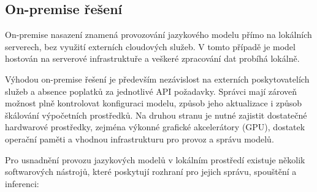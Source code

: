 

\subsection{On-premise řešení}
\label{subsec:deployment-on-premise}

On-premise nasazení znamená provozování jazykového modelu přímo na lokálních serverech, bez využití externích cloudových služeb.
V tomto případě je model hostován na serverové infrastruktuře a veškeré zpracování dat probíhá lokálně.

Výhodou on-premise řešení je především nezávislost na externích poskytovatelích služeb a absence poplatků za jednotlivé API požadavky.
Správci mají zároveň možnost plně kontrolovat konfiguraci modelu, způsob jeho aktualizace i způsob škálování výpočetních prostředků.
Na druhou stranu je nutné zajistit dostatečné hardwarové prostředky, zejména výkonné grafické akcelerátory (GPU), dostatek operační paměti a vhodnou infrastrukturu pro provoz a správu modelů.

Pro usnadnění provozu jazykových modelů v lokálním prostředí existuje několik softwarových nástrojů, které poskytují rozhraní pro jejich správu, spouštění a inferenci:

